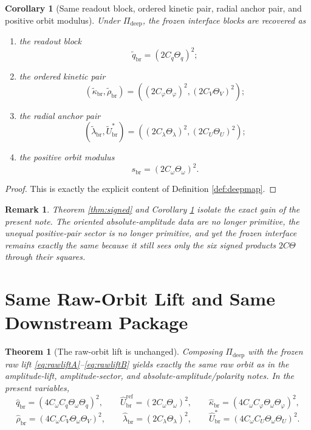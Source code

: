 \documentclass[11pt]{article}
\newcommand{\RespShapeReadout}{\widetilde q_{\mathrm{br}}}
\newcommand{\RespShapeCov}{\widetilde\kappa_{\mathrm{br}}}
\newcommand{\RespShapeRelax}{\widetilde\rho_{\mathrm{br}}}
\newcommand{\RespShapeWell}{\widetilde\lambda_{\mathrm{br}}}
\newcommand{\RespShapeEq}{\widetilde U_{\mathrm{br}}^{\ast}}
\newcommand{\RespRawReadout}{\widehat q_{\mathrm{br}}}
\newcommand{\RespRawRef}{\widehat U_{\mathrm{br}}^{\mathrm{ref}}}
\newcommand{\RespRawCov}{\widehat\kappa_{\mathrm{br}}}
\newcommand{\RespRawRelax}{\widehat\rho_{\mathrm{br}}}
\newcommand{\RespRawWell}{\widehat\lambda_{\mathrm{br}}}
\newcommand{\RespRawEq}{\widehat U_{\mathrm{br}}^{\ast}}
\newcommand{\ScaleMod}{s_{\mathrm{br}}}
\newcommand{\DeepMap}{\Pi_{\mathrm{deep}}}
\newcommand{\MidRead}{C_{q}}
\newcommand{\MidCov}{C_{\varphi}}
\newcommand{\MidRelax}{C_{V}}
\newcommand{\MidWell}{C_{\lambda}}
\newcommand{\MidEq}{C_{U}}
\newcommand{\MidScale}{C_{\omega}}
\newcommand{\FiberRead}{\Theta_{q}}
\newcommand{\FiberCov}{\Theta_{\varphi}}
\newcommand{\FiberRelax}{\Theta_{V}}
\newcommand{\FiberWell}{\Theta_{\lambda}}
\newcommand{\FiberEq}{\Theta_{U}}
\newcommand{\FiberScale}{\Theta_{\omega}}
\newtheorem{remark}{Remark}
\newtheorem{corollary}{Corollary}
\newtheorem{theorem}{Theorem}
\begin{document}
\begin{corollary}[Same readout block, ordered kinetic pair, radial anchor pair, and positive orbit modulus]
\label{cor:blockmap}
Under \(\DeepMap\), the frozen interface blocks are recovered as
\begin{enumerate}
    \item the readout block
    \[
    \RespShapeReadout=(2\MidRead\FiberRead)^{2};
    \]
    \item the ordered kinetic pair
    \[
    (\RespShapeCov,\RespShapeRelax)=((2\MidCov\FiberCov)^{2},(2\MidRelax\FiberRelax)^{2});
    \]
    \item the radial anchor pair
    \[
    (\RespShapeWell,\RespShapeEq)=((2\MidWell\FiberWell)^{2},(2\MidEq\FiberEq)^{2});
    \]
    \item the positive orbit modulus
    \[
    \ScaleMod=(2\MidScale\FiberScale)^{2}.
    \]
\end{enumerate}
\end{corollary}

\begin{proof}
This is exactly the explicit content of Definition \ref{def:deepmap}.
\end{proof}

\begin{remark}
Theorem \ref{thm:signed} and Corollary \ref{cor:blockmap} isolate the exact gain of the present note. The oriented absolute-amplitude data are no longer primitive, the unequal positive-pair sector is no longer primitive, and yet the frozen interface remains exactly the same because it still sees only the six signed products \(2C\Theta\) through their squares.
\end{remark}

\section{Same Raw-Orbit Lift and Same Downstream Package}

\begin{theorem}[The raw-orbit lift is unchanged]
\label{thm:rawlift}
Composing \(\DeepMap\) with the frozen raw lift \eqref{eq:rawliftA}--\eqref{eq:rawliftB} yields exactly the same raw orbit as in the amplitude-lift, amplitude-sector, and absolute-amplitude/polarity notes. In the present variables,
\begin{equation}
\RespRawReadout=(4\MidScale\MidRead\FiberScale\FiberRead)^{2},
\qquad
\RespRawRef=(2\MidScale\FiberScale)^{2},
\qquad
\RespRawCov=(4\MidScale\MidCov\FiberScale\FiberCov)^{2},
\label{eq:rawmidA}
\end{equation}
\begin{equation}
\RespRawRelax=(4\MidScale\MidRelax\FiberScale\FiberRelax)^{2},
\qquad
\RespRawWell=(2\MidWell\FiberWell)^{2},
\qquad
\RespRawEq=(4\MidScale\MidEq\FiberScale\FiberEq)^{2}.
\label{eq:rawmidB}
\end{equation}
\end{theorem}
\end{document}
